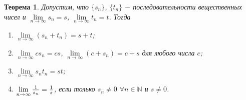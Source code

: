 \documentclass{article}
\newtheorem{theorem}{Теорема}[section]
\begin{document}
\begin{theorem}
Допустим, что \(\{s_n\}\), \(\{t_n\}\) \(-\) последовательности вещественных чисел и \(\lim\limits_{n \to \infty} s_n = s\), \(\lim\limits_{n \to \infty} t_n = t\). Тогда
\begin{enumerate}
    \item \(\lim\limits_{n \to \infty} (s_n + t_n) = s + t\);
    \item \(\lim\limits_{n \to \infty} cs_n = cs\), \(\lim\limits_{n \to \infty} (c + s_n) = c + s\) для любого числа \(c\);
    \item \(\lim\limits_{n \to \infty} {s_n}{t_n} = st\);
    \item \(\lim\limits_{n \to \infty} {1 \over s_n} = {1 \over s}\), если только \(s_n \neq 0\) \(\forall n \in \mathbb{N}\) и \(s \neq 0\).
\end{enumerate}
\end{theorem}
\end{document}
